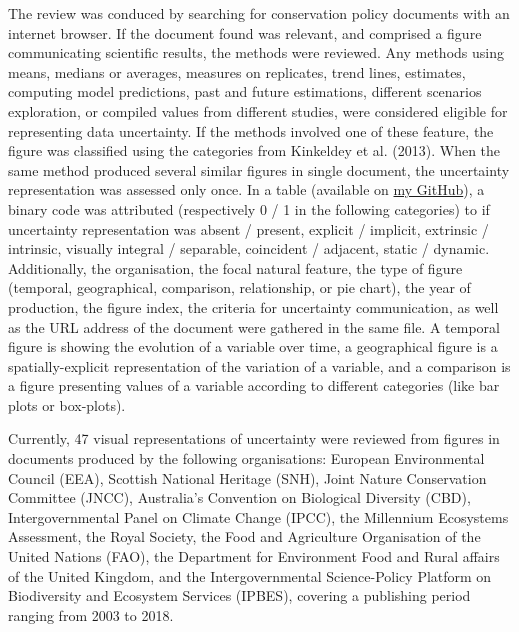 \documentclass[12pt,a4paper]{article}
\begin{document}
The review was conduced by searching for conservation policy documents with an internet browser.
If the document found was relevant, and comprised a figure communicating scientific results, the methods were reviewed. %
Any methods using means, medians or averages, measures on replicates, trend lines, estimates, computing model predictions, past and future estimations, different scenarios exploration, or compiled values from different studies, were considered eligible for representing data uncertainty.
If the methods involved one of these feature, the figure was classified using the categories from Kinkeldey et al. (2013).
When the same method produced several similar figures in single document, the uncertainty representation was assessed only once.
In a table (available on \href{https://github.com/AdrianBach/Workshop-task/blob/master/uncertrepres\textunderscore review2\textunderscore Rtreated.xlsx}{my GitHub}), a binary code was attributed (respectively 0 / 1 in the following categories) to if uncertainty representation was absent / present, explicit / implicit, extrinsic / intrinsic, visually integral / separable, coincident / adjacent, static / dynamic.
Additionally, the organisation, the focal natural feature, the type of figure (temporal, geographical, comparison, relationship, or pie chart), the year of production, the figure index, the criteria for uncertainty communication, as well as the URL address of the document were gathered in the same file.
A temporal figure is showing the evolution of a variable over time, a geographical figure is a spatially-explicit representation of the variation of a variable, and a comparison is a figure presenting values of a variable according to different categories (like bar plots or box-plots).

Currently, 47 visual representations of uncertainty were reviewed from figures in documents produced by the following organisations: European Environmental Council (EEA), Scottish National Heritage (SNH), Joint Nature Conservation Committee (JNCC), Australia's Convention on Biological Diversity (CBD), Intergovernmental Panel on Climate Change (IPCC), the Millennium Ecosystems Assessment, the Royal Society, the Food and Agriculture Organisation of the United Nations (FAO), the Department for Environment Food and Rural affairs of the United Kingdom, and the Intergovernmental Science-Policy Platform on Biodiversity and Ecosystem Services (IPBES), covering a publishing period ranging from 2003 to 2018.%
\end{document}
